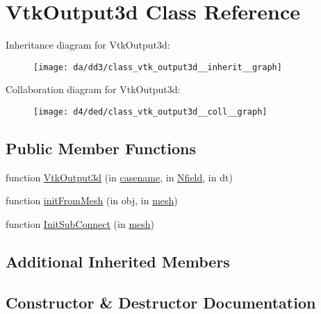 \hypertarget{class_vtk_output3d}{}\section{Vtk\+Output3d Class Reference}
\label{class_vtk_output3d}


Inheritance diagram for Vtk\+Output3d\+:
\nopagebreak
\begin{figure}[H]
\begin{center}
\leavevmode
\texttt{[image: da/dd3/class\_vtk\_output3d\_\_inherit\_\_graph]}
\end{center}
\end{figure}


Collaboration diagram for Vtk\+Output3d\+:
\nopagebreak
\begin{figure}[H]
\begin{center}
\leavevmode
\texttt{[image: d4/ded/class\_vtk\_output3d\_\_coll\_\_graph]}
\end{center}
\end{figure}
\subsection*{Public Member Functions}
\begin{DoxyCompactItemize}
\item 
function \hyperlink{class_vtk_output3d_a8afbbbb1cba231472314cb032cde6a11}{Vtk\+Output3d} (in \hyperlink{class_abstract_output_file_a84df82b3a07c6e5eb1f92f21a74fa1e4}{casename}, in \hyperlink{class_abstract_output_file_afdf632429d019dff27d7f29102512101}{Nfield}, in dt)
\item 
function \hyperlink{class_vtk_output3d_a8c2e330beae23f7e9d2008d0ad59bcf5}{init\+From\+Mesh} (in obj, in \hyperlink{class_abstract_output_file_a499c10c99f2eece91673bc8b8d1d1e99}{mesh})
\item 
function \hyperlink{class_vtk_output3d_a0bd75519af1591519bf673bd04ece8a5}{Init\+Sub\+Connect} (in \hyperlink{class_abstract_output_file_a499c10c99f2eece91673bc8b8d1d1e99}{mesh})
\end{DoxyCompactItemize}
\subsection*{Additional Inherited Members}


\subsection{Constructor \& Destructor Documentation}
\mbox{\label{class_vtk_output3d_a8afbbbb1cba231472314cb032cde6a11}} 
